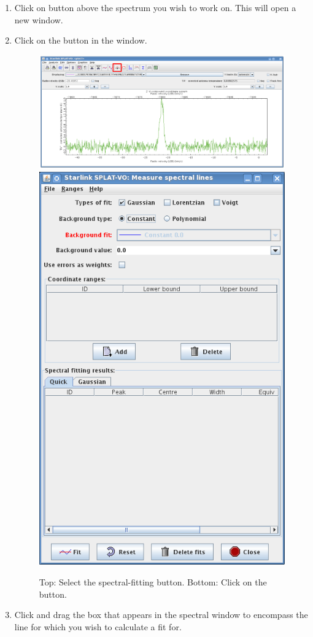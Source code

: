 \documentclass[11pt,oneside,chapters]{starlink}
\begin{document}
\begin{enumerate}[label=(\textbf{\arabic*})]


\item Click on 
button above the spectrum you wish to work on. This will open a
new window.

\item Click on the  button in the
 window.


\begin{figure}[h!]
\begin{center}
\includegraphics[width=0.7\linewidth]{sc20_splat_fit1}
\includegraphics[width=0.45\linewidth]{sc20_splat_fit2}
\caption[Select the SPLAT fit button.]{\label{fig:splat_fit1}
  Top: Select the spectral-fitting button. Bottom: Click on
  the  button.}
\end{center}
\end{figure}


\item Click and drag the box that appears in the spectral window
to encompass the line for which you wish to calculate a fit for.



\end{enumerate}
\end{document}
